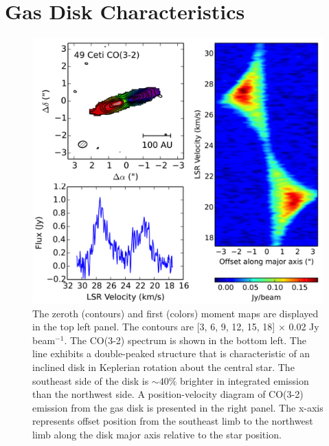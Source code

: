 




\section{Gas Disk Characteristics}

\begin{figure}
\centering
\includegraphics[width=\textwidth,height=\textheight,keepaspectratio]{49CET_CO_plots_sideby.png}
\caption{The zeroth (contours) and first (colors) moment maps are displayed in the top left panel. The contours are [3, 6, 9, 12, 15, 18] $\times$ 0.02 Jy beam$^{-1}$. The CO(3-2) spectrum is shown in the bottom left. The line exhibits a double-peaked structure that is characteristic of an inclined disk in Keplerian rotation about the central star. The southeast side of the disk is $\sim 40 \%$ brighter in integrated emission than the northwest side. A position-velocity diagram of CO(3-2) emission from the gas disk is presented in the right panel. The x-axis represents offset position from the southeast limb to the northwest limb along the disk major axis relative to the star position.}
\label{fig:49CET_CO_plots}
\end{figure}

